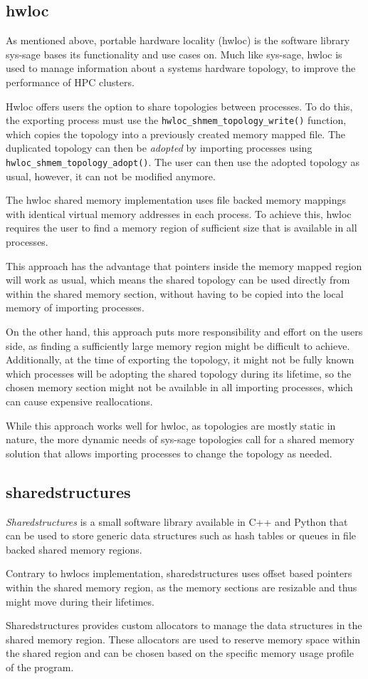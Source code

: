 \subsection*{hwloc}
As mentioned above, portable hardware locality (hwloc) is the software library sys-sage bases its functionality and use cases on.
Much like sys-sage, hwloc is used to manage information about a systems hardware topology, to improve the performance of HPC clusters.

Hwloc offers users the option to share topologies between processes. To do this, the exporting process must use the \lstinline|hwloc_shmem_topology_write()| function,
which copies the topology into a previously created memory mapped file. The duplicated topology can then be \emph{adopted} by importing processes using \lstinline|hwloc_shmem_topology_adopt()|.
The user can then use the adopted topology as usual, however, it can not be modified anymore. \cite{hwloc_docs}

The hwloc shared memory implementation uses file backed memory mappings with identical virtual memory addresses in each process.
To achieve this, hwloc requires the user to find a memory region of sufficient size that is available in all processes.

This approach has the advantage that pointers inside the memory mapped region will work as usual,
which means the shared topology can be used directly from within the shared memory section, without having to be copied into the local memory of importing processes.

On the other hand, this approach puts more responsibility and effort on the users side, as finding a sufficiently large memory region might be difficult to achieve.
Additionally, at the time of exporting the topology, it might not be fully known which processes will be adopting the shared topology during its lifetime, so the chosen memory section might not be available in
all importing processes, which can cause expensive reallocations.

While this approach works well for hwloc, as topologies are mostly static in nature, the more dynamic needs of sys-sage topologies call for a shared memory solution that allows importing processes to change the topology as needed.

\subsection*{sharedstructures}

\emph{Sharedstructures} \cite{sharedstructures} is a small software library available in C++ and Python that can be used to store generic data structures
such as hash tables or queues in file backed shared memory regions.

Contrary to hwlocs implementation, sharedstructures uses offset based pointers within the shared memory region,
as the memory sections are resizable and thus might move during their lifetimes.

Sharedstructures provides custom allocators to manage the data structures in the shared memory region.
These allocators are used to reserve memory space within the shared region and can be chosen based on the specific memory usage profile of the program.
